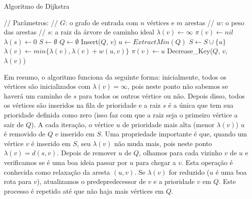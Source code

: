 \documentclass[sn-mathphys,Numbered]{sn-jnl}%
\theoremstyle{thmstyleone}%
\theoremstyle{thmstyletwo}%
\theoremstyle{thmstylethree}%
\begin{document}
\begin{algorithm}[H]
\caption{Algoritmo de Dijkstra}\label{dijkstra_algo}
\begin{algorithmic}
\State // Parâmetros:
\State // $G$: o grafo de entrada com $n$ vértices e $m$ arestas
\State // $w$: o peso das arestas
\State // $s$: a raiz da árvore de caminho ideal
					
	\State $\lambda(v) \gets \infty$
	\State $\pi(v) \gets nil$
\EndFor
\State $\lambda(s) \gets 0$				
\State $S \gets \emptyset$
\State $Q \gets \emptyset$
					
	\State Insert($Q$, $v$)
\EndFor
{}				
	\State $u \gets ExtractMin(Q)$		
	\State $S \gets S \cup \{ u \}$
    				
		\State $\lambda(v) \gets min \{ \lambda(v), \lambda(v) + w(u, v) \}$ 
			
			\State $\pi(v) \gets u$		
            \State Decrease\_Key($Q$, $v$, $\lambda(v)$)	
		\EndIf
	\EndFor
\EndWhile
\EndFunction
\end{algorithmic}
\end{algorithm}

Em resumo, o algoritmo funciona da seguinte forma: inicialmente, todos os vértices são inicializados com $\lambda(v) = \infty$, pois neste ponto não sabemos se haverá um caminho de $s$ para todos os outros vértice ou não. Depois disso, todos os vértices são inseridos na fila de prioridade e a raiz $s$ é a única que tem sua prioridade definida como zero (isso faz com que a raiz seja o primeiro vértice a sair de $Q$). A cada iteração, o vértice $u$ de prioridade mais alta (menor $\lambda(v)$) $u$ é removido de $Q$ e inserido em $S$. Uma propriedade importante é que, quando um vértice $v$ é inserido em $S$, seu $\lambda(v)$ não muda mais, pois neste ponto $\lambda(v) = d(s, v)$. Depois de remover $u$ de $Q$, olhamos para cada vizinho $v$ de $u$ e verificamos se é uma boa ideia passar por $u$ para chegar a $v$. Esta operação é conhecida como relaxação da aresta $(u, v)$. Se $\lambda(v)$ for reduzido ($u$ é uma boa rota para $v$), atualizamos o predepredecessor de $v$ e a prioridade $v$ em $Q$. Este processo é repetido até que não haja mais vértices em $Q$.
\end{document}
